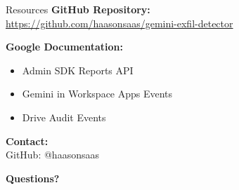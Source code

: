 \documentclass[aspectratio=169]{beamer}
\begin{document}
\begin{frame}{Resources}
\textbf{GitHub Repository:} \\
\url{https://github.com/haasonsaas/gemini-exfil-detector}

\vspace{1em}

\textbf{Google Documentation:}
\begin{itemize}
    \item Admin SDK Reports API
    \item Gemini in Workspace Apps Events
    \item Drive Audit Events
\end{itemize}

\vspace{1em}

\textbf{Contact:} \\
GitHub: @haasonsaas

\vspace{1em}

\centering
\Large
\textbf{Questions?}
\end{frame}
\end{document}

